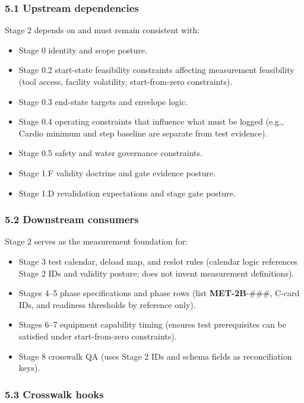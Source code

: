 \documentclass[10pt]{article}
\begin{document}
\subsubsection*{5.1 Upstream dependencies}

Stage 2 depends on and must remain consistent with:

\begin{itemize}
\item Stage 0 identity and scope posture.
\item Stage 0.2 start-state feasibility constraints affecting measurement feasibility (tool access, facility volatility, start-from-zero constraints).
\item Stage 0.3 end-state targets and envelope logic.
\item Stage 0.4 operating constraints that influence what must be logged (e.g., Cardio minimum and step baseline are separate from test evidence).
\item Stage 0.5 safety and water governance constraints.
\item Stage 1.F validity doctrine and gate evidence posture.
\item Stage 1.D revalidation expectations and stage gate posture.
\end{itemize}

\subsubsection*{5.2 Downstream consumers}

Stage 2 serves as the measurement foundation for:

\begin{itemize}
\item Stage 3 test calendar, deload map, and reslot rules (calendar logic references Stage 2 IDs and validity posture; does not invent measurement definitions).
\item Stages 4–5 phase specifications and phase rows (list \textbf{MET-2B}-\#\#\#, C-card IDs, and readiness thresholds by reference only).
\item Stages 6–7 equipment capability timing (ensures test prerequisites can be satisfied under start-from-zero constraints).
\item Stage 8 crosswalk QA (uses Stage 2 IDs and schema fields as reconciliation keys).
\end{itemize}

\subsubsection*{5.3 Crosswalk hooks}
\end{document}

